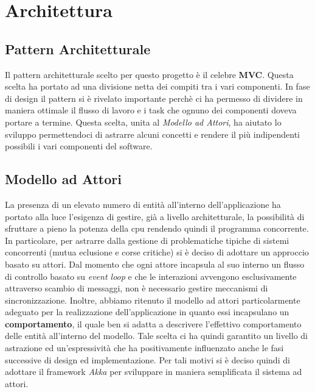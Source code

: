 \section{Architettura}

\subsection{Pattern Architetturale}
Il pattern architetturale scelto per questo progetto è il celebre \textbf{MVC}.
Questa scelta ha portato ad una divisione netta dei compiti tra i vari componenti. In fase di design il pattern si
è rivelato importante perchè ci ha permesso di dividere in maniera ottimale il flusso di lavoro e i task che ognuno dei
componenti doveva portare a termine. Questa scelta, unita al \textit{Modello ad Attori}, ha aiutato
lo sviluppo permettendoci di astrarre alcuni concetti e rendere il più indipendenti possibili i vari componenti del software.

\subsection{Modello ad Attori}
La presenza di un elevato numero di entità all’interno dell’applicazione ha portato alla luce
l’esigenza di gestire, già a livello architetturale, la possibilità di sfruttare a pieno la potenza
della cpu rendendo quindi il programma concorrente. In particolare, per astrarre dalla gestione
di problematiche tipiche di sistemi concorrenti (mutua eclusione e corse critiche) si è deciso di
adottare un approccio basato su attori. Dal momento che ogni attore incapsula al suo interno
un flusso di controllo basato su \textit{event loop} e che le interazioni avvengono esclusivamente
attraverso scambio di messaggi, non è necessario gestire meccanismi di sincronizzazione.
Inoltre, abbiamo ritenuto il modello ad attori particolarmente adeguato per la realizzazione
dell’applicazione in quanto essi incapsulano un \textbf{comportamento}, il quale ben si adatta a
descrivere l’effettivo comportamento delle entità all’interno del modello. Tale scelta ci ha
quindi garantito un livello di astrazione ed un’espressività che ha positivamente influenzato
anche le fasi successive di design ed implementazione. Per tali motivi si è deciso quindi di adottare il framework
\textit{Akka} per sviluppare in maniera semplificata il sistema ad attori.

